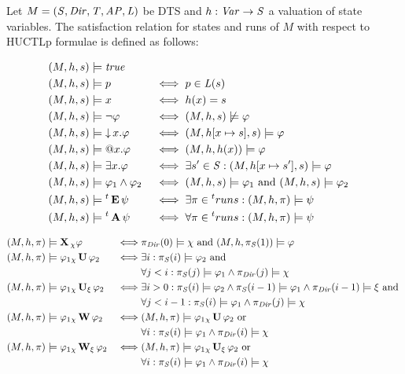 Let $M = (\mathit{S}, \mathit{Dir}, \mathit{T}, \mathit{AP}, \mathit{L})$ be \ac{DTS} and $h : \mathit{Var} \to \mathit{S}$ a valuation of state variables. The satisfaction relation for states and runs of $M$ with respect to \ac{HUCTLp} formulae is defined as follows:

\begin{alignat*}{2}
	(M,h,s) &\models \mathit{true}	\\
	(M,h,s) &\models p										   && \iff p \in \mathit{L}(s) \\
	(M,h,s) &\models x										   && \iff h(x) = s \\
	(M,h,s) &\models \neg \varphi  						  && \iff (M, h,s) \not\models \varphi \\
	(M,h,s) &\models \operatorname{\downarrow} x. \varphi 			   && \iff (M,h[x \mapsto s], s) \models \varphi \\
	(M,h,s) &\models \operatorname{@\!} x. \varphi 				&& \iff (M,h,h(x)) \models \varphi \\
	(M,h,s) &\models \exists x. \varphi 		  && \iff \exists s' \in \mathit{S} :  (M,h[x \mapsto s'], s) \models \varphi \\	
	(M,h,s) &\models \varphi_1 \land \varphi_2 	   && \iff (M,h,s) \models \varphi_1 \text{ and } (M,h,s) \models \varphi_2  \\
	(M,h,s) &\models {}^{t}\operatorname{\mathbf{E}} \psi 			 && \iff \exists \pi \in {}^{t}runs : (M,h,\pi) \models \psi \\
	(M,h,s) &\models {}^{t}\operatorname{\mathbf{A}} \psi 			 && \iff \forall \pi \in {}^{t}runs : (M,h,\pi) \models \psi \\	
\end{alignat*}

\begin{alignat*}{2}
	(M,h,\pi) &\models \operatorname{\mathbf{X}}{}_{\chi} \varphi								& \iff & \pi_{\mathit{Dir}}(0) \models \chi \text{ and } (M, h, \pi_{\mathit{S}}(1)) \models \varphi \\
	(M,h,\pi) &\models \varphi_1 {}_{\chi}\operatorname{\mathbf{U}} \varphi_2		  & \iff & \exists i : \pi_{\mathit{S}}(i) \models \varphi_2 \text{ and } \\
				  &																		 & 		 & \forall j < i : \pi_{\mathit{S}}(j) \models \varphi_1 \land \pi_{\mathit{Dir}}(j) \models \chi \\
	(M,h,\pi) &\models \varphi_1 {}_{\chi}\operatorname{\mathbf{U}}_{\xi} \varphi_2 	 & \iff & \exists i > 0 : \pi_{\mathit{S}}(i) \models \varphi_2 \land \pi_{\mathit{S}}(i-1) \models \varphi_1 \land \pi_{\mathit{Dir}}(i-1) \models \xi  \text{ and } \\
				  & 																	  & 	 & \forall j < i - 1 : \pi_{\mathit{S}}(i) \models \varphi_1 \land \pi_{\mathit{Dir}}(j) \models \chi \\
	(M,h,\pi) &\models \varphi_1 {}_{\chi}\operatorname{\mathbf{W}} \varphi_2		  & \iff & (M,h,\pi) \models \varphi_1 {}_{\chi}\operatorname{\mathbf{U}} \varphi_2 \text{ or } \\
				  &																		 & 		 & \forall i : \pi_{\mathit{S}}(i) \models \varphi_1 \land \pi_{\mathit{Dir}}(i) \models \chi \\
	(M,h,\pi) &\models \varphi_1 {}_{\chi}\operatorname{\mathbf{W}}_{\xi} \varphi_2		  & \iff & (M,h,\pi) \models \varphi_1 {}_{\chi}\operatorname{\mathbf{U}}_{\xi} \varphi_2 \text{ or } \\
&																		 & 		 & \forall i : \pi_{\mathit{S}}(i) \models \varphi_1 \land \pi_{\mathit{Dir}}(i) \models \chi \\
\end{alignat*}

